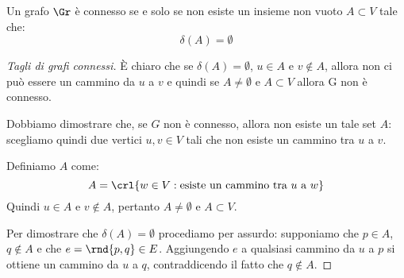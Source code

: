 \documentclass[\main/main.tex]{subfiles}
\begin{document}
\begin{theorem}
  Un grafo \(\Gr \) è connesso se e solo se non esiste un insieme non vuoto \(A \subset V\) tale che:
  \[
    \delta(A) = \emptyset
  \]
\end{theorem}
\begin{proof}[Tagli di grafi connessi]
  È chiaro che se \(\delta(A) = \emptyset \), \(u \in A\) e \(v \not\in A\), allora non ci può essere un cammino da \(u\) a \(v\) e quindi se \(A \neq \emptyset \) e \(A \subset V\) allora G non è connesso.

  Dobbiamo dimostrare che, se \(G\) non è connesso, allora non esiste un tale set \(A\): scegliamo quindi due vertici \(u, v \in V\) tali che non esiste un cammino tra \(u\) a \(v\).

  Definiamo \(A\) come:
  \[
    A = \crl{w \in V: \text{esiste un cammino tra \(u\) a \(w\)}}
  \]
  Quindi \(u \in A\) e \(v \not\in A\), pertanto \(A \neq \emptyset \) e \(A \subset V\).

  Per dimostrare che \(\delta(A) = \emptyset \) procediamo per assurdo: supponiamo che \(p \in A\), \(q \not\in A\) e che \(e = \rnd{p,q} \in E\). Aggiungendo \(e\) a qualsiasi cammino da \(u\) a \(p\) si ottiene un cammino da \(u\) a \(q\), contraddicendo il fatto che \(q \not\in A\).
\end{proof}
\clearpage
\end{document}
